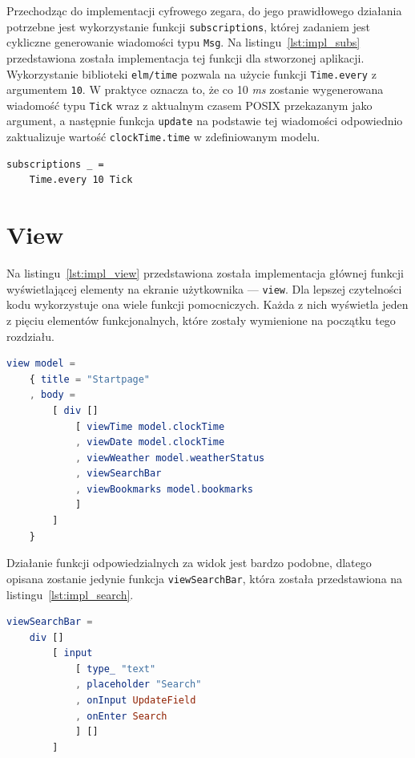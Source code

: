 \documentclass[twoside,a4paper]{report}
\begin{document}
Przechodząc do implementacji cyfrowego zegara, do jego prawidłowego działania potrzebne jest wykorzystanie funkcji \texttt{subscriptions}, której zadaniem jest cykliczne generowanie wiadomości typu \texttt{Msg}.
Na listingu~\ref{lst:impl_subs} przedstawiona została implementacja tej funkcji dla stworzonej aplikacji.
Wykorzystanie biblioteki \texttt{elm/time} pozwala na użycie funkcji \texttt{Time.every} z argumentem \texttt{10}.
W praktyce oznacza to, że co 10 \textit{ms} zostanie wygenerowana wiadomość typu \texttt{Tick} wraz z aktualnym czasem POSIX przekazanym jako argument, a następnie funkcja \texttt{update} na podstawie tej wiadomości odpowiednio zaktualizuje wartość \texttt{clockTime.time} w zdefiniowanym modelu.

\begin{lstlisting}[mathescape,caption={Implementacja funkcji \texttt{subscriptions}},label={lst:impl_subs}]
subscriptions _ =
    Time.every 10 Tick
\end{lstlisting}

\section{View}
Na listingu~\ref{lst:impl_view} przedstawiona została implementacja głównej funkcji wyświetlającej elementy na ekranie użytkownika --- \texttt{view}.
Dla lepszej czytelności kodu wykorzystuje ona wiele funkcji pomocniczych.
Każda z nich wyświetla jeden z pięciu elementów funkcjonalnych, które zostały wymienione na początku tego rozdziału.
\begin{lstlisting}[mathescape,caption={Implementacja funkcji \texttt{view}},label={lst:impl_view},language={Elm}]
view model =
    { title = "Startpage"
    , body =
        [ div []
            [ viewTime model.clockTime
            , viewDate model.clockTime
            , viewWeather model.weatherStatus
            , viewSearchBar
            , viewBookmarks model.bookmarks
            ]
        ]
    }
\end{lstlisting}

Działanie funkcji odpowiedzialnych za widok jest bardzo podobne, dlatego opisana zostanie jedynie funkcja \texttt{viewSearchBar}, która została przedstawiona na listingu~\ref{lst:impl_search}.
\begin{lstlisting}[mathescape,caption={Implementacja funkcji \texttt{viewSearchBar}},label={lst:impl_search},language={Elm}]
viewSearchBar =
    div []
        [ input
            [ type_ "text"
            , placeholder "Search"
            , onInput UpdateField
            , onEnter Search
            ] []
        ]
\end{lstlisting}
\end{document}
